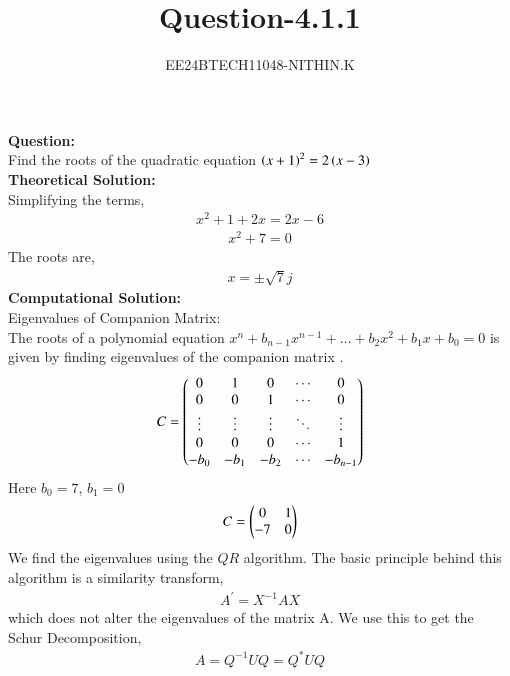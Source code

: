 \documentclass[journal]{IEEEtran}
\numberwithin{equation}{enumi}
\numberwithin{figure}{enumi}
\begin{document}


\title{Question-4.1.1}
\author{EE24BTECH11048-NITHIN.K} 
{\let\newpage\relax\maketitle}
\textbf{Question:}\\
Find the roots of the quadratic equation $\left(x + 1\right)^2 = 2\left(x - 3\right)$\\
\textbf{Theoretical Solution:}\\
Simplifying the terms,
\begin{align}
	x^2 + 1 + 2x = 2x - 6
\end{align}
\begin{align}
	x^2 + 7 = 0
\end{align}
The roots are,
\begin{align}
	x = \pm \sqrt{7}j
\end{align}
\textbf{Computational Solution:}\\
Eigenvalues of Companion Matrix:\\
The roots of a polynomial equation $x^n+b_{n-1}x^{n-1}+\dots+b_2x^2+b_1x+b_0 = 0$ is given by finding eigenvalues of the companion matrix .
\begin{align}
	C = \begin{pmatrix}0 & 1 & 0 & \cdots & 0\\ 
	0 & 0 & 1 & \cdots & 0 \\
	\vdots & \vdots & \vdots & \ddots & \vdots\\
	0 & 0 & 0 & \cdots & 1\\
	-b_0 & -b_1 & -b_2 & \cdots & -b_{n-1}\end{pmatrix}
\end{align}
Here $b_0 = 7$, $b_1 = 0$
\begin{align}
	C = \begin{pmatrix}0 & 1\\
	-7 & 0\end{pmatrix}
\end{align}
We find the eigenvalues using the $QR$ algorithm. The basic principle behind this algorithm is a similarity transform,
\begin{align}
	A^{\prime} = X^{-1}AX
\end{align}
which does not alter the eigenvalues of the matrix A. 
\newline
We use this to get the Schur Decomposition,
\begin{align}
	A = Q^{-1}UQ = Q^{\ast}UQ
\end{align}
\end{document}
